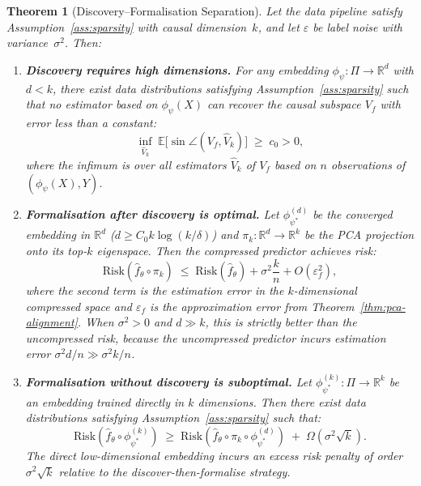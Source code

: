 \documentclass[11pt,a4paper]{article}
\theoremstyle{plain}
\newtheorem{theorem}{Theorem}[section]
\theoremstyle{definition}
\theoremstyle{remark}
\newcommand{\R}{\mathbb{R}}
\newcommand{\E}{\mathbb{E}}
\begin{document}
\begin{theorem}[Discovery--Formalisation Separation]%
\label{thm:discovery-formalisation}
Let the data pipeline satisfy Assumption~\ref{ass:sparsity} with causal
dimension~$k$, and let $\varepsilon$ be label noise with variance~$\sigma^2$.
Then:

\begin{enumerate}[label=\textup{(\alph*)},leftmargin=2.5em,itemsep=4pt]
  \item \textbf{Discovery requires high dimensions.}
    For any embedding $\phi_\psi : \Pi \to \R^d$ with $d < k$, there exist
    data distributions satisfying Assumption~\ref{ass:sparsity} such that no
    estimator based on $\phi_\psi(X)$ can recover the causal subspace $V_f$ with
    error less than a constant:
    \begin{equation}\label{eq:disc-lower}
      \inf_{\hat{V}_k} \;
      \E\bigl[\sin\angle(V_f, \hat{V}_k)\bigr]
      \;\geq\; c_0 > 0,
    \end{equation}
    where the infimum is over all estimators $\hat{V}_k$ of $V_f$ based on
    $n$ observations of $(\phi_\psi(X), Y)$.

  \item \textbf{Formalisation after discovery is optimal.}
    Let $\phi_{\psi^*}^{(d)}$ be the converged embedding in $\R^d$
    ($d \geq C_0 k\log(k/\delta)$) and
    $\pi_k : \R^d \to \R^k$ be the PCA projection onto its top-$k$ eigenspace.
    Then the compressed predictor achieves risk:
    \begin{equation}\label{eq:formal-risk}
      \mathrm{Risk}(\hat{f}_\theta \circ \pi_k)
      \;\leq\;
      \mathrm{Risk}(\hat{f}_\theta)
      + \sigma^2\frac{k}{n}
      + O(\varepsilon_f^2),
    \end{equation}
    where the second term is the estimation error in the $k$-dimensional
    compressed space and $\varepsilon_f$ is the approximation error from
    Theorem~\ref{thm:pca-alignment}.  When $\sigma^2 > 0$ and $d \gg k$,
    this is \emph{strictly better} than the uncompressed risk, because the
    uncompressed predictor incurs estimation error $\sigma^2 d/n \gg
    \sigma^2 k/n$.

  \item \textbf{Formalisation without discovery is suboptimal.}
    Let $\phi_{\psi^*}^{(k)} : \Pi \to \R^k$ be an embedding trained directly
    in $k$ dimensions.  Then there exist data distributions satisfying
    Assumption~\ref{ass:sparsity} such that:
    \begin{equation}\label{eq:skip-penalty}
      \mathrm{Risk}(\hat{f}_\theta \circ \phi_{\psi^*}^{(k)})
      \;\geq\;
      \mathrm{Risk}(\hat{f}_\theta \circ \pi_k \circ \phi_{\psi^*}^{(d)})
      \;+\; \Omega\!\left(\sigma^2\sqrt{k}\right).
    \end{equation}
    The direct low-dimensional embedding incurs an excess risk penalty of order
    $\sigma^2\sqrt{k}$ relative to the discover-then-formalise strategy.
\end{enumerate}
\end{theorem}
\end{document}
